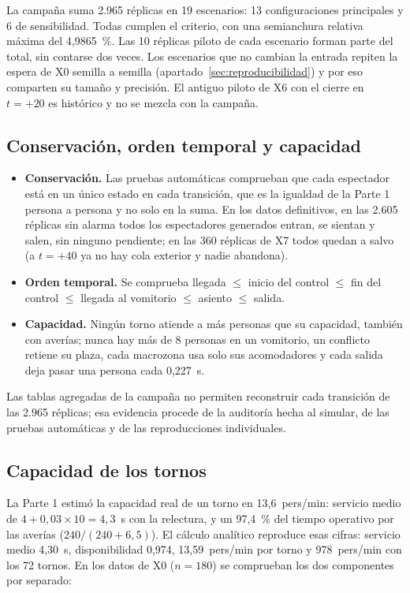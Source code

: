 La campaña suma 2.965 réplicas en 19 escenarios: 13 configuraciones principales y
6 de sensibilidad. Todas cumplen el criterio, con una semianchura relativa máxima
del 4,9865~\%. Las 10 réplicas piloto de cada escenario forman parte del total,
sin contarse dos veces. Los escenarios que no cambian la entrada repiten la
espera de X0 semilla a semilla (apartado~\ref{sec:reproducibilidad}) y por eso
comparten su tamaño y precisión. El antiguo piloto de X6 con el cierre en
$t=+20$ es histórico y no se mezcla con la campaña.

\subsection{Conservación, orden temporal y capacidad}

\begin{itemize}
  \item \textbf{Conservación.} Las pruebas automáticas comprueban que cada
    espectador está en un único estado en cada transición, que es la igualdad de
    la Parte 1 persona a persona y no solo en la suma. En los datos definitivos,
    en las 2.605 réplicas sin alarma todos los espectadores generados entran, se
    sientan y salen, sin ninguno pendiente; en las 360 réplicas de X7 todos quedan
    a salvo (a $t=+40$ ya no hay cola exterior y nadie abandona).
  \item \textbf{Orden temporal.} Se comprueba llegada $\le$ inicio del control
    $\le$ fin del control $\le$ llegada al vomitorio $\le$ asiento $\le$ salida.
  \item \textbf{Capacidad.} Ningún torno atiende a más personas que su
    capacidad, también con averías; nunca hay más de 8 personas en un vomitorio,
    un conflicto retiene su plaza, cada macrozona usa solo sus acomodadores y cada
    salida deja pasar una persona cada 0,227~s.
\end{itemize}

Las tablas agregadas de la campaña no permiten reconstruir cada transición de las
2.965 réplicas; esa evidencia procede de la auditoría hecha al simular, de las
pruebas automáticas y de las reproducciones individuales.

\subsection{Capacidad de los tornos}

La Parte 1 estimó la capacidad real de un torno en 13,6~pers/min: servicio medio
de $4 + 0{,}03\times 10 = 4{,}3$~s con la relectura, y un 97,4~\% del tiempo
operativo por las averías ($240/(240+6{,}5)$). El cálculo analítico reproduce
esas cifras: servicio medio 4,30~s, disponibilidad 0,974, 13,59~pers/min por
torno y 978~pers/min con los 72 tornos. En los datos de X0 ($n=180$) se
comprueban los dos componentes por separado:

